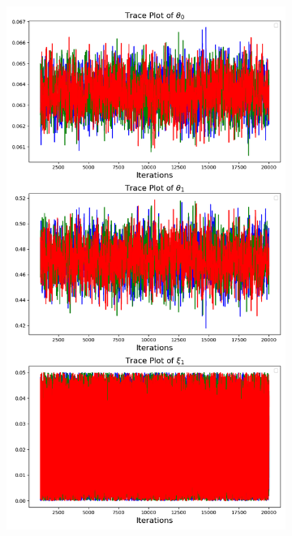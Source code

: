 \documentclass{beamer}
\begin{document}
\begin{frame}
\begin{figure}[H]
\begin{subfigure}{0.3\textwidth}
            \label{fig:vacuum_joint_acf}
        \end{subfigure}\hfill
        \begin{subfigure}{0.3\textwidth}
            \centering
            \includegraphics[width=\linewidth]{figures/vacuum_lock_reduced_trace_plot_theta.png}
            \label{fig:vacuum_joint_trace}

\end{subfigure}
\end{figure}
\end{frame}
\end{document}
